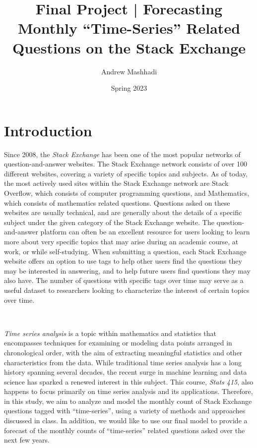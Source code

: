 \documentclass[10pt]{article}
\title{\vspace{-2.0cm}Final Project | Forecasting Monthly ``Time-Series'' Related Questions on the Stack Exchange}
\author{Andrew Mashhadi}
\date{Spring 2023}
\begin{document}
\maketitle

\section*{Introduction} 

Since 2008, the \textit{Stack Exchange} has been one of the most popular networks of question-and-answer websites. The Stack Exchange network consists of over 100 different websites, covering a variety of specific topics and subjects. As of today, the most actively used sites within the Stack Exchange network are Stack Overflow, which consists of computer programming questions, and Mathematics, which consists of mathematics related questions. Questions asked on these websites are usually technical, and are generally about the details of a specific subject under the given category of the Stack Exchange website. The question-and-answer platform can often be an excellent resource for users looking to learn more about very specific topics that may arise during an academic course, at work, or while self-studying. When submitting a question, each Stack Exchange website offers an option to use tags to help other users find the questions they may be interested in answering, and to help future users find questions they may also have. The number of questions with specific tags over time may serve as a useful dataset to researchers looking to characterize the interest of certain topics over time.

\

\textit{Time series analysis} is a topic within mathematics and statistics that encompasses techniques for examining or modeling data points arranged in chronological order, with the aim of extracting meaningful statistics and other characteristics from the data. While traditional time series analysis has a long history spanning several decades, the recent surge in machine learning and data science has sparked a renewed interest in this subject. This course, \textit{Stats 415}, also happens to focus primarily on time series analysis and its applications. Therefore, in this study, we aim to analyze and model the monthly count of Stack Exchange questions tagged with ``time-series'', using a variety of methods and approaches discussed in class. In addition, we would like to use our final model to provide a forecast of the monthly counts of ``time-series'' related questions asked over the next few years. 
\end{document}
